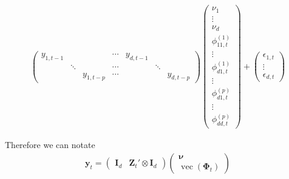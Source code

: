 \documentclass[fleqn]{article}
\begin{document}
\begin{align*}
\begin{pmatrix}
        y_{1, t-1} &        &            & \cdots & y_{d, t-1} &        &            \\
                   & \ddots &            & \cdots &            & \ddots &            \\
                   &        & y_{1, t-p} & \cdots &            &        & y_{d, t-p}
    \end{pmatrix}
    \begin{pmatrix}
        \nu_1 \\
        \vdots \\
        \nu_d \\
        \phi^{(1)}_{11, t} \\
        \vdots \\
        \phi^{(1)}_{d1, t} \\
        \vdots \\
        \phi^{(p)}_{d1, t} \\
        \vdots \\
        \phi^{(p)}_{dd, t}
    \end{pmatrix}
    +
    \begin{pmatrix}
        \epsilon_{1, t} \\
        \vdots \\
        \epsilon_{d, t}
    \end{pmatrix}
\end{align*}

Therefore we can notate
\begin{align*}
    \bm y_t = \begin{pmatrix}
        \bm I_d & \bm Z_t' \otimes \bm I_d
    \end{pmatrix}
    \begin{pmatrix}
        \bm \nu \\
        \operatorname{vec}(\bm \Phi_t)
    \end{pmatrix}
\end{align*}
\end{document}
